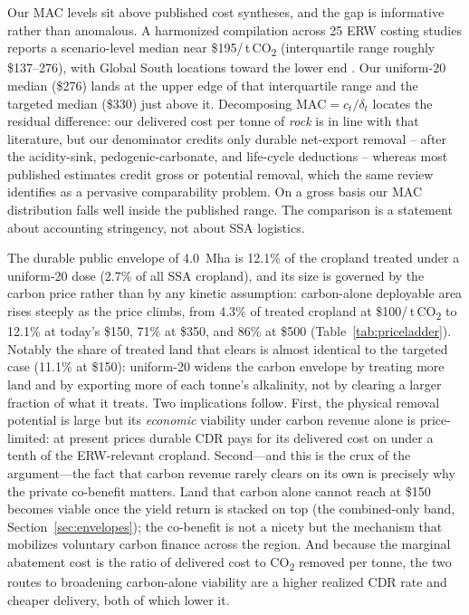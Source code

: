 \documentclass[12pt]{article}
\newcommand{\tco}{\,t\,CO\textsubscript{2}}
\newcommand{\co}{CO\textsubscript{2}}
\begin{document}
Our MAC levels sit above published cost syntheses, and the gap is informative
rather than anomalous. A harmonized compilation across 25 ERW costing studies
reports a scenario-level median near \$195/\tco{} (interquartile range roughly
\$137--276), with Global South locations toward the lower end
\citep{suhrhoff2026esroc}. Our uniform-20 median (\$276) lands at the upper edge
of that interquartile range and the targeted median (\$330) just above it.
Decomposing $\mathrm{MAC} = c_t/\delta_t$ locates the residual
difference: our delivered cost per tonne of \emph{rock} is in line with that
literature, but our denominator credits only durable net-export removal -- after
the acidity-sink, pedogenic-carbonate, and life-cycle deductions -- whereas most
published estimates credit gross or potential removal, which the same review
identifies as a pervasive comparability problem. On a gross basis our MAC
distribution falls well inside the published range. The comparison is a statement
about accounting stringency, not about SSA logistics.

The durable public envelope of 4.0~Mha is 12.1\% of the cropland treated under a
uniform-20 dose (2.7\% of all SSA cropland), and its size is governed by the carbon
price rather than by any kinetic assumption: carbon-alone deployable area rises
steeply as the price climbs, from 4.3\% of treated cropland at \$100/\tco{} to 12.1\%
at today's \$150, 71\% at \$350, and 86\% at \$500 (Table~\ref{tab:priceladder}).
Notably the share of treated land that clears is almost identical to the targeted
case (11.1\% at \$150): uniform-20 widens the carbon envelope by treating more land
and by exporting more of each tonne's alkalinity, not by clearing a larger fraction
of what it treats. Two implications follow. First, the physical removal potential is
large but its \emph{economic} viability under carbon revenue alone is price-limited:
at present prices durable CDR pays for its delivered cost on under a tenth of the
ERW-relevant cropland. Second---and this is the crux of the argument---the fact that
carbon revenue rarely clears on its own is precisely why the private co-benefit
matters. Land that carbon alone cannot reach at \$150 becomes viable once the yield
return is stacked on top (the combined-only band, Section~\ref{sec:envelopes}); the
co-benefit is not a nicety but the mechanism that mobilizes voluntary carbon finance
across the region. And because the marginal abatement cost is the ratio of delivered
cost to \co{} removed per tonne, the two routes to broadening carbon-alone viability
are a higher realized CDR rate and cheaper delivery, both of which lower it.
\end{document}
